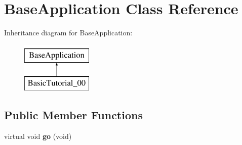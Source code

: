 \hypertarget{class_base_application}{\section{Base\-Application Class Reference}
\label{class_base_application}
}
Inheritance diagram for Base\-Application\-:\begin{figure}[H]
\begin{center}
\leavevmode
\includegraphics[height=2.382979cm]{class_base_application}
\end{center}
\end{figure}
\subsection*{Public Member Functions}
\begin{DoxyCompactItemize}
\item 
\hypertarget{class_base_application_a8a14a65a29118dd75173aa68678a05e1}{virtual void {\bfseries go} (void)}\label{class_base_application_a8a14a65a29118dd75173aa68678a05e1}

\end{DoxyCompactItemize}
